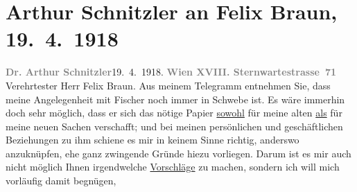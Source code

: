

         \renewcommand{\erwaehnteInstitutionen}{Institutionen: Georg Müller Verlag, S. Fischer Verlag}
         \renewcommand{\erwaehnteOrte}{Orte: München, Sternwartestraße, Wien}
         \renewcommand{\erwaehnteWerke}{Werke: Casanovas Heimfahrt, Die Schwestern oder Casanova in Spa. Lustspiel in Versen, Doktor Gräsler, Badearzt, Gesammelte Werke}
               \section[Arthur Schnitzler an Felix Braun, 19. 4. 1918]{ Arthur Schnitzler an Felix Braun, 19. 4. 1918}\nopagebreak{}\rehead{ }\begin{ledgroupsized}[t]{13cm}\normalsize\beginnumbering \toendnotes[C]{\smallbreak\pagebreak[2]} 
\toendnotes[C]{\smallbreak}\pstart
           {\pb}\textcolor{gray}{\textbf{Dr. Arthur Schnitzler}}\hfill 19. 4. 1918.\pend
           \pstart
           \textcolor{gray}{\textbf{Wien XVIII. Sternwartestrasse 71}}\pend
           \pstart\center{}Verehrtester Herr Felix Braun.\pend\pstart
           Aus meinem Telegramm entnehmen Sie, dass meine Angelegenheit mit Fischer noch immer in Schwebe ist. Es wäre immerhin doch
                    sehr möglich, dass er sich das nötige Papier \uline{sowohl} für meine alten \uline{als} für meine
                    neuen Sachen verschafft; und bei meinen persönlichen und geschäftlichen
                    Beziehungen zu ihm schiene es mir in keinem Sinne richtig, anderswo anzuknüpfen,
                    ehe ganz zwingende Gründe hiezu vorliegen. Darum ist es mir auch nicht möglich
                    Ihnen \introOben{}irgend\introOben{}welche \uline{Vorschläge} zu machen, sondern ich will mich vorläufig damit begnügen,

\end{ledgroupsized}

